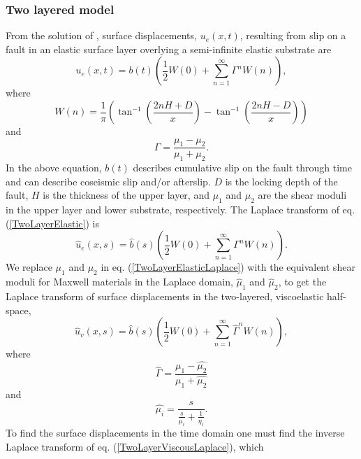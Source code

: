 \subsubsection{Two layered model}\label{2D2LModel}
From the solution of \citet{Rybicki1971}, surface displacements,
$u_{e}(x,t)$, resulting from slip on a fault in an elastic surface
layer overlying a semi-infinite elastic substrate are
\begin{equation}\label{TwoLayerElastic}
  u_{e}(x,t) = b(t)\left(\frac{1}{2} W(0) + 
    \sum_{n=1}^\infty \Gamma^nW(n)\right),
\end{equation}
where
\begin{equation}
  W(n) = \frac{1}{\pi}\left(\tan^{-1}\left(\frac{2nH + D}{x}\right) 
    - \tan^{-1}\left(\frac{2nH - D}{x}\right)\right)
\end{equation}
and
\begin{equation}
  \Gamma = \frac{\mu_1 - \mu_2}{\mu_1 + \mu_2}.
\end{equation}
In the above equation, $b(t)$ describes cumulative slip on the fault
through time and can describe coseismic slip and/or afterslip. $D$ is
the locking depth of the fault, $H$ is the thickness of the upper
layer, and $\mu_1$ and $\mu_2$ are the shear moduli in the upper
layer and lower substrate, respectively.  The Laplace transform of
eq. (\ref{TwoLayerElastic}) is
\begin{equation}\label{TwoLayerElasticLaplace}
 \hat{u}_e(x,s) = \hat{b}(s)\left(\frac{1}{2} W(0) +\sum_{n=1}^\infty\Gamma^nW(n)\right).
\end{equation}
We replace $\mu_1$ and $\mu_2$ in eq. (\ref{TwoLayerElasticLaplace})
with the equivalent shear moduli for Maxwell materials in the Laplace
domain, $\hat{\mu}_1$ and $\hat{\mu}_2$, to get the Laplace
transform of surface displacements in the two-layered, viscoelastic
half-space,
\begin{equation}\label{TwoLayerViscousLaplace}
 \hat{u}_v(x,s) = \hat{b}(s)\left(\frac{1}{2}W(0) +\sum_{n=1}^\infty\hat{\Gamma}^nW(n)\right),
\end{equation}
where
\begin{equation}
  \hat{\Gamma} = \frac{\hat{\mu_1} - \hat{\mu_2}}{\hat{\mu_1} + \hat{\mu_2}}
\end{equation}
and
\begin{equation}
  \hat{\mu_i} = \frac{s}{\frac{s}{\mu_i} + \frac{1}{\eta_i}}.
\end{equation}
To find the surface displacements in the time domain one must find the
inverse Laplace transform of eq. (\ref{TwoLayerViscousLaplace}), which
